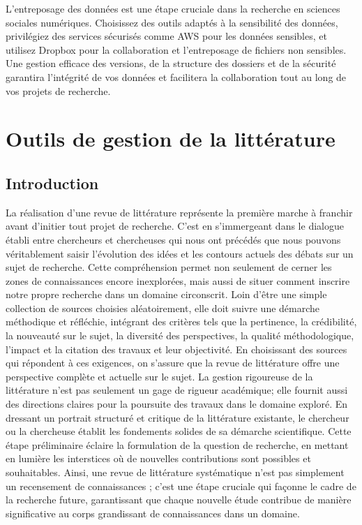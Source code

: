 \documentclass[
  letterpaper,
  DIV=11,
  numbers=noendperiod]{scrreprt}
\begin{document}
L'entreposage des données est une étape cruciale dans la recherche en
sciences sociales numériques. Choisissez des outils adaptés à la
sensibilité des données, privilégiez des services sécurisés comme AWS
pour les données sensibles, et utilisez Dropbox pour la collaboration et
l'entreposage de fichiers non sensibles. Une gestion efficace des
versions, de la structure des dossiers et de la sécurité garantira
l'intégrité de vos données et facilitera la collaboration tout au long
de vos projets de recherche.


\chapter{Outils de gestion de la littérature}\label{sec-chap4}

\section{Introduction}\label{introduction}

La réalisation d'une revue de littérature représente la première marche
à franchir avant d'initier tout projet de recherche. C'est en
s'immergeant dans le dialogue établi entre chercheurs et chercheuses qui
nous ont précédés que nous pouvons véritablement saisir l'évolution des
idées et les contours actuels des débats sur un sujet de recherche.
Cette compréhension permet non seulement de cerner les zones de
connaissances encore inexplorées, mais aussi de situer comment inscrire
notre propre recherche dans un domaine circonscrit. Loin d'être une
simple collection de sources choisies aléatoirement, elle doit suivre
une démarche méthodique et réfléchie, intégrant des critères tels que la
pertinence, la crédibilité, la nouveauté sur le sujet, la diversité des
perspectives, la qualité méthodologique, l'impact et la citation des
travaux et leur objectivité. En choisissant des sources qui répondent à
ces exigences, on s'assure que la revue de littérature offre une
perspective complète et actuelle sur le sujet. La gestion rigoureuse de
la littérature n'est pas seulement un gage de rigueur académique; elle
fournit aussi des directions claires pour la poursuite des travaux dans
le domaine exploré. En dressant un portrait structuré et critique de la
littérature existante, le chercheur ou la chercheuse établit les
fondements solides de sa démarche scientifique. Cette étape préliminaire
éclaire la formulation de la question de recherche, en mettant en
lumière les interstices où de nouvelles contributions sont possibles et
souhaitables. Ainsi, une revue de littérature systématique n'est pas
simplement un recensement de connaissances ; c'est une étape cruciale
qui façonne le cadre de la recherche future, garantissant que chaque
nouvelle étude contribue de manière significative au corps grandissant
de connaissances dans un domaine.
\end{document}
